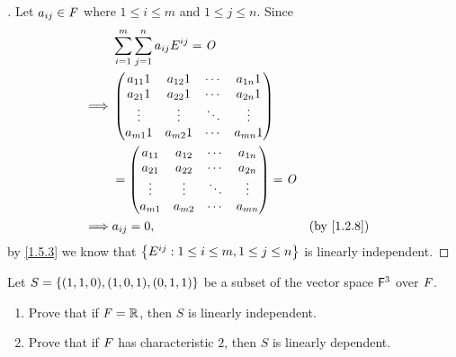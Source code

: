 \begin{proof}[]
  Let \(a_{i j} \in \mathit{F}\) where \(1 \leq i \leq m\) and \(1 \leq j \leq n\).
  Since
  \begin{align*}
             & \sum_{i = 1}^m \sum_{j = 1}^{n} a_{i j} E^{i j} = \zm                 \\
    \implies & \begin{pmatrix}
                 a_{1 1} 1 & a_{1 2} 1 & \cdots & a_{1 n} 1 \\
                 a_{2 1} 1 & a_{2 2} 1 & \cdots & a_{2 n} 1 \\
                 \vdots    & \vdots    & \ddots & \vdots    \\
                 a_{m 1} 1 & a_{m 2} 1 & \cdots & a_{m n} 1
               \end{pmatrix}                            \\
             & = \begin{pmatrix}
                   a_{1 1} & a_{1 2} & \cdots & a_{1 n} \\
                   a_{2 1} & a_{2 2} & \cdots & a_{2 n} \\
                   \vdots  & \vdots  & \ddots & \vdots  \\
                   a_{m 1} & a_{m 2} & \cdots & a_{m n}
                 \end{pmatrix} = \zm                                \\
    \implies & a_{i j} = 0,                                          &  & \by{1.2.8}
  \end{align*}
  by \cref{1.5.3} we know that \(\left\lbrace E^{i j} : 1 \leq i \leq m, 1 \leq j \leq n\right\rbrace\) is linearly independent.
\end{proof}

\setcounter{ex}{7}
\begin{ex}\label{ex:1.5.8}
  Let \(S = \left\lbrace(1, 1, 0), (1, 0, 1), (0, 1, 1)\right\rbrace\) be a subset of the vector space \(\mathsf{F}^3\) over \(\mathit{F}\).
  \begin{enumerate}
    \item Prove that if \(\mathit{F} = \mathbb{R}\), then \(S\) is linearly independent.
    \item Prove that if \(\mathit{F}\) has characteristic \(2\), then \(S\) is linearly dependent.
  \end{enumerate}
\end{ex}

